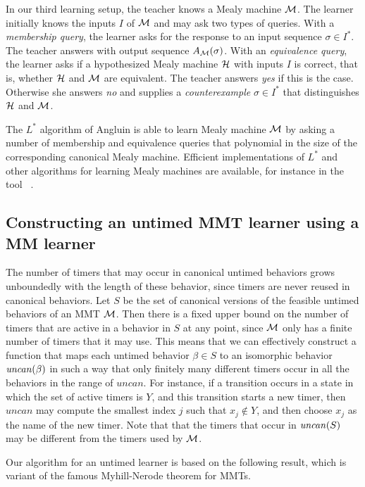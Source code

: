 In our third learning setup, the teacher knows a Mealy machine ${\cal M}$. 
The learner initially knows the inputs $I$ of ${\cal M}$ and may ask two types of queries.
With a \emph{membership query}, the learner asks for the response to an input sequence $\sigma \in I^{\ast}$.
The teacher answers with output sequence $A_{{\cal M}}(\sigma)$.
With an \emph{equivalence query}, the learner asks if a hypothesized Mealy machine ${\cal H}$ with
inputs $I$ is correct, that is, whether ${\cal H}$ and ${\cal M}$ are equivalent.
The teacher answers \emph{yes} if this is the case. Otherwise she answers \emph{no} and supplies a
\emph{counterexample} $\sigma \in I^{\ast}$ that distinguishes ${\cal H}$ and ${\cal M}$.

The $L^{\ast}$ algorithm of Angluin \cite{Ang87} is able to learn Mealy machine ${\cal M}$ by asking a
number of membership and equivalence queries that polynomial in the size of the corresponding canonical Mealy machine.
Efficient implementations of $L^{\ast}$ and other algorithms for learning Mealy machines are available,
for instance in the tool \learnlib\ \cite{Nie03,RSBM09,MertenSHM11}.

\subsection{Constructing an untimed MMT learner using a MM learner}
The number of timers that may occur in canonical untimed behaviors grows unboundedly with the length of these behavior,
since timers are never reused in canonical behaviors.
Let $S$ be the set of canonical versions of the feasible untimed behaviors of an MMT ${\cal M}$.
Then there is a fixed upper bound on the number of timers that are active in a behavior in $S$ at any point,
since ${\cal M}$ only has a finite number of timers that it may use.
This means that we can effectively construct a function that maps each untimed behavior $\beta \in S$
to an isomorphic behavior $\mathit{uncan}({\beta})$ in such a way that only finitely many
different timers occur in all the behaviors in the range of $\mathit{uncan}$.
For instance, if a transition occurs in a state in which the set of active timers is $Y$, and this transition
starts a new timer, then $\mathit{uncan}$ may compute the smallest index $j$
such that $x_j \not\in Y$, and then choose $x_j$ as the name of the new timer.
Note that that the timers that occur in $\mathit{uncan}({S})$ may be different from the timers used by ${\cal M}$.

Our algorithm for an untimed learner is based on the following result, which is variant of the famous 
Myhill-Nerode theorem for MMTs.

